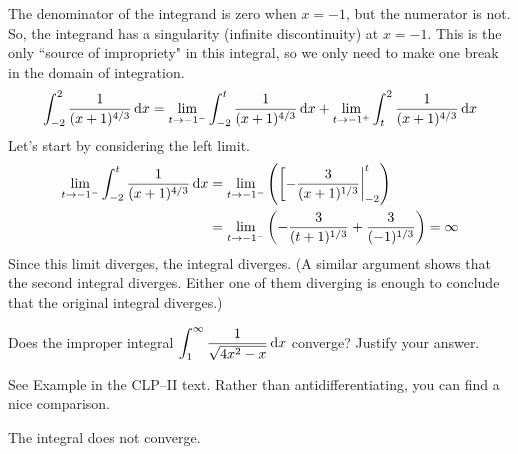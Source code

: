 \begin{solution}
The denominator of the integrand is zero when $x=-1$, but the numerator is not. So, the integrand has a singularity (infinite discontinuity) at $x=-1$. This is the only ``source of impropriety" in this integral, so we only need to make one break in the domain of integration.
\begin{equation*}
\int_{-2}^2\frac{1}{(x+1)^{4/3}}\,\mathrm{d}x
=\lim_{t\rightarrow -1^-}\int_{-2}^t \frac{1}{(x+1)^{4/3}}\,\mathrm{d}x
  +\lim_{t\rightarrow -1^+}\int_t^2 \frac{1}{(x+1)^{4/3}}\,\mathrm{d}x
\end{equation*}
Let's start by considering the left limit.
\begin{align*}
\lim_{t \to -1^-}\int_{-2}^t \frac{1}{(x+1)^{4/3}}\,\mathrm{d}x
&=\lim_{t \to -1^-}\left(\left[-\frac{3}{(x+1)^{1/3}}\right|_{-2}^t\right)\\
&=\lim_{t \to -1^-}\left(-\frac{3}{(t+1)^{1/3}}+\frac{3}{(-1)^{1/3}}\right)=\infty
\end{align*}
Since this limit diverges, the integral diverges. (A similar argument shows
that the second integral diverges. Either one of them diverging is enough to conclude that the
original integral diverges.)
\end{solution}


\begin{question}[1997D]
 Does the improper integral
$\displaystyle\int_1^\infty\frac{1}{\sqrt{4x^2-x}}\,\mathrm{d}x$ converge? Justify your
answer.
\end{question}

\begin{hint}
See Example  in the
CLP--II text. Rather than antidifferentiating, you can find a nice comparison.
\end{hint}

\begin{answer}
The integral does not converge.
\end{answer}

